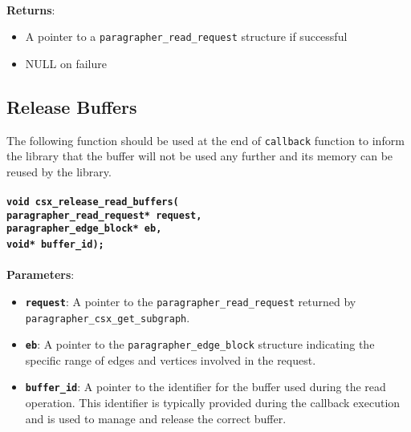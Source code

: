 \documentclass[a4paper]{article}
\begin{document}
~\\
\textbf{Returns}:
    \begin{itemize}
    \setlength{\itemsep}{0pt}
    \setlength{\parskip}{0pt}
    \setlength{\parsep}{0pt}

    \item A pointer to a \texttt{paragrapher\_read\_request} structure if successful
    \item NULL on failure
    \end{itemize}

\subsection{Release Buffers}
The following function should be used at the end of \verb|callback| function to 
inform the library that the buffer will not be 
used any further and its memory can be reused by the library.
\\
\\
\textbf{\texttt{void csx\_release\_read\_buffers(
\\{\indent}paragrapher\_read\_request* request,
\\{\indent}paragrapher\_edge\_block* eb,
\\{\indent}void* buffer\_id);}}
~\\
\\

\textbf{Parameters}:
\begin{itemize}
    \setlength{\itemsep}{0pt}
    \setlength{\parskip}{0pt}
    \setlength{\parsep}{0pt}
    \item \textbf{\texttt{request}}: A pointer to the \texttt{paragrapher\_read\_request} 
    returned by \texttt{paragrapher\_csx\_get\_subgraph}.
    \item \textbf{\texttt{eb}}: A pointer to the \texttt{paragrapher\_edge\_block} 
    structure indicating the specific range of edges and vertices involved in the request.
    \item \textbf{\texttt{buffer\_id}}: A pointer to the identifier for 
    the buffer used during the read operation. This identifier is typically 
    provided during the callback execution and is used to manage and release the correct buffer.
\end{itemize}
\end{document}
